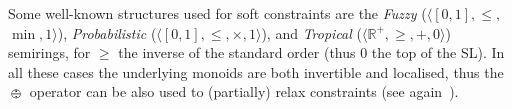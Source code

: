 \documentclass{llncs}
\newcommand{\shortNoProof}[1]{ }
\def\monop{\otimes}
\def\odiv{\, {\ominus\hspace{-7.7pt} \div} \,}
\begin{document}
\shortNoProof{
\begin{proof} ($\Longrightarrow$)
The first item is immediate. Now, let $a \leq b$. Since $b \leq (b \otimes c) \odiv c$ and 
$c \otimes (a \odiv c) \leq a$, the second item follows.

($\Longleftarrow$)
Using the monotonicity of $\odiv$ from $b \monop c \leq a$ we get
 $(b \monop c) \odiv b \leq a \odiv b$, and by the first item
 $c \leq a \odiv b$.
 From the latter by the monotonicity of $\otimes$ we get
 $b \otimes c \leq b \otimes (a \odiv b)$, and by the first item
 $b \monop c \leq a$.
\qed
\end{proof}
}



\begin{remark}\label{rmk:soft}
	Some well-known structures used for soft constraints are the 
	\emph{Fuzzy} ($\langle [0,1], \leq,$ $\min, 1 \rangle$), \emph{Probabilistic} ($\langle [0,1], \leq, \allowbreak\times, 1 \rangle$), 
	and \emph{Tropical}   ($\langle \mathbb{R}^+, \geq, +, 0 \rangle$) semirings, for $\geq$ the inverse of the standard order 
	(thus $0$ the top of the SL). In all these cases the underlying monoids 
	are both invertible and localised, thus
	the $\odiv$ operator can be also used to
	(partially) relax constraints (see again~\cite{ecai06}).
\end{remark}
\end{document}
